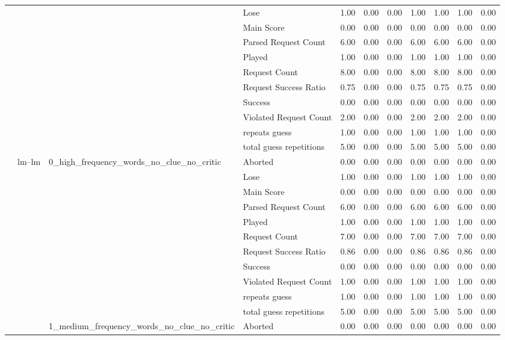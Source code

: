 \begin{tabular}{llllrrrrrrr}
 &  &  & Lose & 1.00 & 0.00 & 0.00 & 1.00 & 1.00 & 1.00 & 0.00 \\
 &  &  & Main Score & 0.00 & 0.00 & 0.00 & 0.00 & 0.00 & 0.00 & 0.00 \\
 &  &  & Parsed Request Count & 6.00 & 0.00 & 0.00 & 6.00 & 6.00 & 6.00 & 0.00 \\
 &  &  & Played & 1.00 & 0.00 & 0.00 & 1.00 & 1.00 & 1.00 & 0.00 \\
 &  &  & Request Count & 8.00 & 0.00 & 0.00 & 8.00 & 8.00 & 8.00 & 0.00 \\
 &  &  & Request Success Ratio & 0.75 & 0.00 & 0.00 & 0.75 & 0.75 & 0.75 & 0.00 \\
 &  &  & Success & 0.00 & 0.00 & 0.00 & 0.00 & 0.00 & 0.00 & 0.00 \\
 &  &  & Violated Request Count & 2.00 & 0.00 & 0.00 & 2.00 & 2.00 & 2.00 & 0.00 \\
 &  &  & repeats guess & 1.00 & 0.00 & 0.00 & 1.00 & 1.00 & 1.00 & 0.00 \\
 &  &  & total guess repetitions & 5.00 & 0.00 & 0.00 & 5.00 & 5.00 & 5.00 & 0.00 \\
\cline{2-11} \cline{3-11}
 & \multirow[t]{33}{*}{lm--lm} & \multirow[t]{11}{*}{0_high_frequency_words_no_clue_no_critic} & Aborted & 0.00 & 0.00 & 0.00 & 0.00 & 0.00 & 0.00 & 0.00 \\
 &  &  & Lose & 1.00 & 0.00 & 0.00 & 1.00 & 1.00 & 1.00 & 0.00 \\
 &  &  & Main Score & 0.00 & 0.00 & 0.00 & 0.00 & 0.00 & 0.00 & 0.00 \\
 &  &  & Parsed Request Count & 6.00 & 0.00 & 0.00 & 6.00 & 6.00 & 6.00 & 0.00 \\
 &  &  & Played & 1.00 & 0.00 & 0.00 & 1.00 & 1.00 & 1.00 & 0.00 \\
 &  &  & Request Count & 7.00 & 0.00 & 0.00 & 7.00 & 7.00 & 7.00 & 0.00 \\
 &  &  & Request Success Ratio & 0.86 & 0.00 & 0.00 & 0.86 & 0.86 & 0.86 & 0.00 \\
 &  &  & Success & 0.00 & 0.00 & 0.00 & 0.00 & 0.00 & 0.00 & 0.00 \\
 &  &  & Violated Request Count & 1.00 & 0.00 & 0.00 & 1.00 & 1.00 & 1.00 & 0.00 \\
 &  &  & repeats guess & 1.00 & 0.00 & 0.00 & 1.00 & 1.00 & 1.00 & 0.00 \\
 &  &  & total guess repetitions & 5.00 & 0.00 & 0.00 & 5.00 & 5.00 & 5.00 & 0.00 \\
\cline{3-11}
 &  & \multirow[t]{11}{*}{1_medium_frequency_words_no_clue_no_critic} & Aborted & 0.00 & 0.00 & 0.00 & 0.00 & 0.00 & 0.00 & 0.00 \\

\end{tabular}
